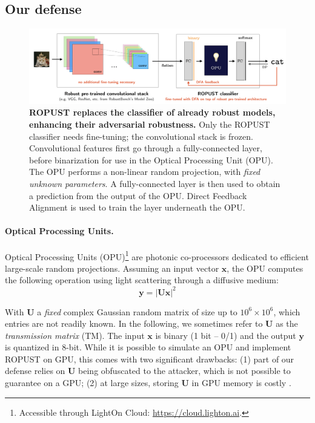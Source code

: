 \documentclass{article}
\begin{document}
\subsection{Our defense}\label{sec:defense}
\begin{figure}
    \centering
    \includegraphics[width=\textwidth]{ropust.png}
    \caption{\textbf{ROPUST replaces the classifier of already robust models, enhancing their adversarial robustness.} Only the ROPUST classifier needs fine-tuning; the convolutional stack is frozen. Convolutional features first go through a fully-connected layer, before binarization for use in the Optical Processing Unit (OPU). The OPU performs a non-linear random projection, with \emph{fixed unknown parameters}. A fully-connected layer is then used to obtain a prediction from the output of the OPU. Direct Feedback Alignment is used to train the layer underneath the OPU.}
    \label{fig:ropust}
\end{figure}
\paragraph{Optical Processing Units.} Optical Processing Units (OPU)\footnote{Accessible through LightOn Cloud: \url{https://cloud.lighton.ai}.} are photonic co-processors dedicated to efficient large-scale random projections. Assuming an input vector $\mathbf{x}$, the OPU computes the following operation using light scattering through a diffusive medium:
\begin{equation}\label{eq:opu}
    \mathbf{y} = \lvert \mathbf{Ux}\rvert^2
\end{equation}

With $\textbf{U}$ a \emph{fixed} complex Gaussian random matrix of size up to $10^6\times 10^6$, which entries are not readily known. In the following, we sometimes refer to $\mathbf{U}$ as the \emph{transmission matrix} (TM). The input $\textbf{x}$ is binary (1 bit -- 0/1) and the output $\textbf{y}$ is quantized in 8-bit. While it is possible to simulate an OPU and implement ROPUST on GPU, this comes with two significant drawbacks: (1) part of our defense relies on $\mathbf{U}$ being obfuscated to the attacker, which is not possible to guarantee on a GPU; (2) at large sizes, storing $\mathbf{U}$ in GPU memory is costly \cite{ohana2020kernel}. 
\end{document}
